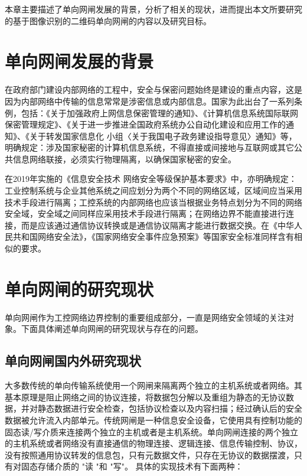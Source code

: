 \label{cha:intro}

本章主要描述了单向网闸发展的背景，分析了相关的现状，进而提出本文所要研究的基于图像识别的二维码单向网闸的内容以及研究目标。

\section{单向网闸发展的背景}

在政府部门建设内部网络的工程中，安全与保密问题始终是建设的重点内容，这是因为内部网络中传输的信息常常是涉密信息或内部信息\cite{李结松2002办公网络安全策略研究及技术实现,马剑沁0信息化背景下的保密管理研究}。国家为此出台了一系列条例，包括：《关于加强政府上网信息保密管理的通知》、《计算机信息系统国际联网保密管理规定》、《关于进一步推进全国政府系统办公自动化建设和应用工作的通知》、《关于转发国家信息化 小组〈关于我国电子政务建设指导意见〉通知》等，明确规定：涉及国家秘密的计算机信息系统，不得直接或间接地与互联网或其它公共信息网络联接，必须实行物理隔离，以确保国家秘密的安全\cite{彭小利2010专网共享公网信息的研究}。

在2019年实施的《信息安全技术 网络安全等级保护基本要求》中，亦明确规定：工业控制系统与企业其他系统之间应划分为两个不同的网络区域，区域间应当采用技术手段进行隔离；工控系统的内部网络也应该当根据业务特点划分为不同的网络安全域，安全域之间同样应采用技术手段进行隔离；在网络边界不能直接进行连接，而是应该通过通信协议转换或是通信协议隔离才能进行数据交换。在《中华人民共和国网络安全法》，《国家网络安全事件应急预案》等国家安全标准同样含有相似的要求\cite{刘文2019等保}。

\section{单向网闸的研究现状}

单向网闸作为工控网络边界控制的重要组成部分，一直是网络安全领域的关注对象。下面具体阐述单向网闸的研究现状与存在的问题。

\subsection{单向网闸国内外研究现状}
大多数传统的单向传输系统使用一个网闸来隔离两个独立的主机系统或者网络。其基本原理是阻止网络之间的协议连接，将数据包分解以及重组为静态的无协议数据，并对静态数据进行安全检查，包括协议检查以及内容扫描；经过确认后的安全数据被允许流入内部单元。\cite{万月亮2010基于光闸的单向传输系统可靠性研究}传统网闸是一种信息安全设备，它使用具有控制功能的固态读/写介质来连接两个独立的主机或者是主机系统。单向网闸连接的两个独立的主机系统或者网络没有直接通信的物理连接、逻辑连接、信息传输控制、协议，没有按照通用协议转发的信息包，只有元数据文件，只存在无协议的数据摆渡，只有对固态存储介质的 "读 "和 "写"。\cite{范毅2005基于}
具体的实现技术有下面两种：

